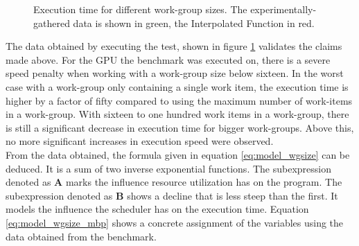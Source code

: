 \begin{figure}[p]
	\begin{center}
		\caption{Execution time for different work-group sizes. The experimentally-gathered data is shown in green, the Interpolated Function in red.}
		\label{fig:model_wgsize}
	\end{center}
\end{figure}

The data obtained by executing the test, shown in figure \ref{fig:model_wgsize} validates the claims made above. For the GPU the benchmark was executed on, there is a severe speed penalty when working with a work-group size below sixteen. In the worst case with a work-group only containing a single work item, the execution time is higher by a factor of fifty compared to using the maximum number of work-items in a work-group. With sixteen to one hundred work items in a work-group, there is still a significant decrease in execution time for bigger work-groups. Above this, no more significant increases in execution speed were observed. \\

From the data obtained, the formula given in equation \ref{eq:model_wgsize} can be deduced. It is a sum of two inverse exponential functions. The subexpression denoted as \textbf{A} marks the influence resource utilization has on the program. The subexpression denoted as \textbf{B} shows a decline that is less steep than the first. It models the influence the scheduler has on the execution time. Equation \ref{eq:model_wgsize_mbp} shows a concrete assignment of the variables using the data obtained from the benchmark.

